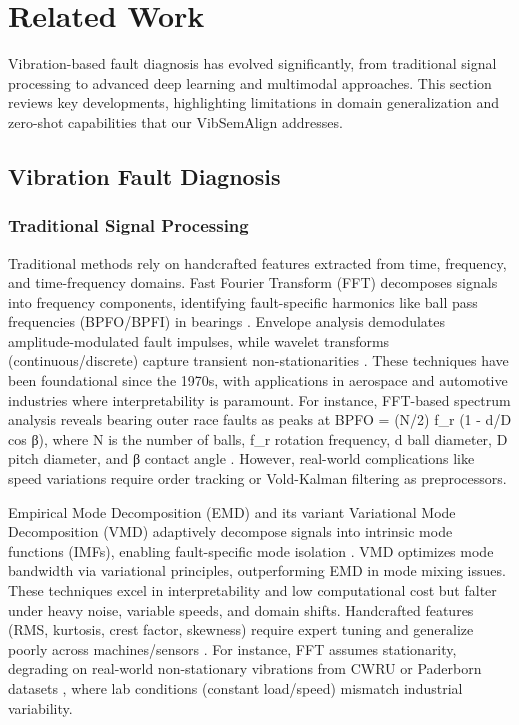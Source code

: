 \section{Related Work}

Vibration-based fault diagnosis has evolved significantly, from traditional signal processing to advanced deep learning and multimodal approaches. This section reviews key developments, highlighting limitations in domain generalization and zero-shot capabilities that our VibSemAlign addresses.

\subsection{Vibration Fault Diagnosis}
\subsubsection{Traditional Signal Processing}
Traditional methods rely on handcrafted features extracted from time, frequency, and time-frequency domains. Fast Fourier Transform (FFT) decomposes signals into frequency components, identifying fault-specific harmonics like ball pass frequencies (BPFO/BPFI) in bearings \cite{randall2011vibration}. Envelope analysis demodulates amplitude-modulated fault impulses, while wavelet transforms (continuous/discrete) capture transient non-stationarities \cite{lei2018review}. These techniques have been foundational since the 1970s, with applications in aerospace and automotive industries where interpretability is paramount. For instance, FFT-based spectrum analysis reveals bearing outer race faults as peaks at BPFO = (N/2) f_r (1 - d/D cos β), where N is the number of balls, f_r rotation frequency, d ball diameter, D pitch diameter, and β contact angle \cite{randall2011vibration}. However, real-world complications like speed variations require order tracking or Vold-Kalman filtering as preprocessors.

Empirical Mode Decomposition (EMD) and its variant Variational Mode Decomposition (VMD) adaptively decompose signals into intrinsic mode functions (IMFs), enabling fault-specific mode isolation \cite{dragomiretskiy2014emd}. VMD optimizes mode bandwidth via variational principles, outperforming EMD in mode mixing issues. These techniques excel in interpretability and low computational cost but falter under heavy noise, variable speeds, and domain shifts. Handcrafted features (RMS, kurtosis, crest factor, skewness) require expert tuning and generalize poorly across machines/sensors \cite{wen2020domain}. For instance, FFT assumes stationarity, degrading on real-world non-stationary vibrations from CWRU or Paderborn datasets \cite{casewestern,paderborn}, where lab conditions (constant load/speed) mismatch industrial variability.

